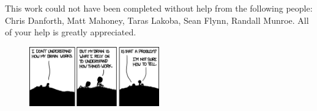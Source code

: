 This work could not have been completed without help from the following people: Chris Danforth, Matt Mahoney, Taras Lakoba, Sean Flynn, Randall Munroe.
All of your help is greatly appreciated.

\begin{figure}[ht]
  \centering
  \includegraphics[width=0.5\textwidth]{figure/xkcd}
  \label{fig:xkcd}
\end{figure}

